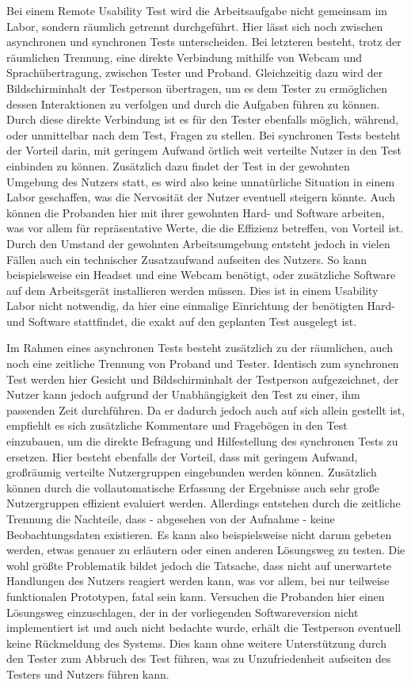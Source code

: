Bei einem Remote Usability Test wird die Arbeitsaufgabe nicht gemeinsam im Labor, sondern räumlich getrennt durchgeführt.
Hier lässt sich noch zwischen asynchronen und synchronen Tests unterscheiden.
Bei letzteren besteht, trotz der räumlichen Trennung, eine direkte Verbindung mithilfe von Webcam und Sprachübertragung, zwischen Tester und Proband.
Gleichzeitig dazu wird der Bildschirminhalt der Testperson übertragen, um es dem Tester zu ermöglichen dessen Interaktionen zu verfolgen und durch die Aufgaben führen zu können.
Durch diese direkte Verbindung ist es für den Tester ebenfalls möglich, während, oder unmittelbar nach dem Test, Fragen zu stellen.
Bei synchronen Tests besteht der Vorteil darin, mit geringem Aufwand örtlich weit verteilte Nutzer in den Test einbinden zu können.
Zusätzlich dazu findet der Test in der gewohnten Umgebung des Nutzers statt, es wird also keine unnatürliche Situation in einem Labor geschaffen, was die Nervosität der Nutzer eventuell steigern könnte.
Auch können die Probanden hier mit ihrer gewohnten Hard- und Software arbeiten, was vor allem für repräsentative Werte, die die Effizienz betreffen, von Vorteil ist.
Durch den Umstand der gewohnten Arbeitsumgebung entsteht jedoch in vielen Fällen auch ein technischer Zusatzaufwand aufseiten des Nutzers.
So kann beispielsweise ein Headset und eine Webcam benötigt, oder zusätzliche Software auf dem Arbeitsgerät installieren werden müssen.
Dies ist in einem Usability Labor nicht notwendig, da hier eine einmalige Einrichtung der benötigten Hard- und Software stattfindet, die exakt auf den geplanten Test ausgelegt ist.

Im Rahmen eines asynchronen Tests besteht zusätzlich zu der räumlichen, auch noch eine zeitliche Trennung von Proband und Tester.
Identisch zum synchronen Test werden hier Gesicht und Bildschirminhalt der Testperson aufgezeichnet, der Nutzer kann jedoch aufgrund der Unabhängigkeit den Test zu einer, ihm passenden Zeit durchführen.
Da er dadurch jedoch auch auf sich allein gestellt ist, empfiehlt es sich zusätzliche Kommentare und Fragebögen in den Test einzubauen, um die direkte Befragung und Hilfestellung des synchronen Tests zu ersetzen.
Hier besteht ebenfalls der Vorteil, dass mit geringem Aufwand, großräumig verteilte Nutzergruppen eingebunden werden können.
Zusätzlich können durch die vollautomatische Erfassung der Ergebnisse auch sehr große Nutzergruppen effizient evaluiert werden.
Allerdings entstehen durch die zeitliche Trennung die Nachteile, dass - abgesehen von der Aufnahme - keine Beobachtungsdaten existieren.
Es kann also beispielsweise nicht darum gebeten werden, etwas genauer zu erläutern oder einen anderen Lösungsweg zu testen.
Die wohl größte Problematik bildet jedoch die Tatsache, dass nicht auf unerwartete Handlungen des Nutzers reagiert werden kann, was vor allem, bei nur teilweise funktionalen Prototypen, fatal sein kann.
Versuchen die Probanden hier einen Lösungsweg einzuschlagen, der in der vorliegenden Softwareversion nicht implementiert ist und auch nicht bedachte wurde, erhält die Testperson eventuell keine Rückmeldung des Systems.
Dies kann ohne weitere Unterstützung durch den Tester zum Abbruch des Test führen, was zu Unzufriedenheit aufseiten des Testers und Nutzers führen kann.\cite{Sarodnick.2016}

